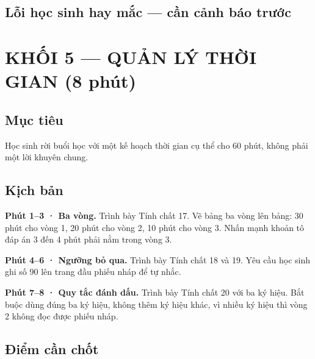 \documentclass[11pt, a4paper]{article}
\begin{document}
\subsection{Lỗi học sinh hay mắc — cần cảnh báo trước}


\section{KHỐI 5 — QUẢN LÝ THỜI GIAN (8 phút)}

\subsection{Mục tiêu}

Học sinh rời buổi học với một kế hoạch thời gian cụ thể cho 60 phút, không phải một lời khuyên chung.

\subsection{Kịch bản}

\textbf{Phút 1–3 · Ba vòng.} Trình bày Tính chất 17. Vẽ bảng ba vòng lên bảng: 30 phút cho vòng 1, 20 phút cho vòng 2, 10 phút cho vòng 3. Nhấn mạnh khoản tô đáp án 3 đến 4 phút phải nằm trong vòng 3.

\textbf{Phút 4–6 · Ngưỡng bỏ qua.} Trình bày Tính chất 18 và 19. Yêu cầu học sinh ghi số 90 lên trang đầu phiếu nháp để tự nhắc.

\textbf{Phút 7–8 · Quy tắc đánh dấu.} Trình bày Tính chất 20 với ba ký hiệu. Bắt buộc dùng đúng ba ký hiệu, không thêm ký hiệu khác, vì nhiều ký hiệu thì vòng 2 không đọc được phiếu nháp.

\subsection{Điểm cần chốt}
\end{document}
